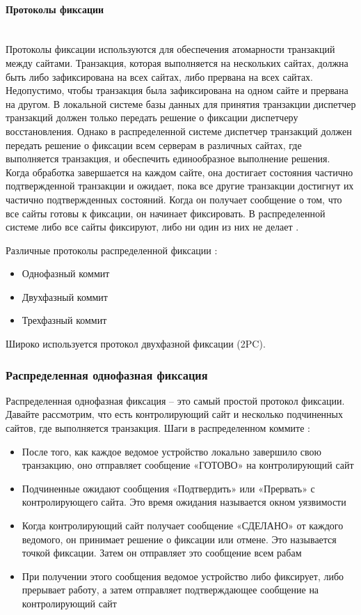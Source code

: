 \paragraph{Протоколы фиксации}~\\
Протоколы фиксации используются для обеспечения атомарности транзакций между сайтами.
Транзакция, которая выполняется на нескольких сайтах, должна быть либо зафиксирована на всех сайтах, либо прервана на всех сайтах.
Недопустимо, чтобы транзакция была зафиксирована на одном сайте и прервана на другом.
В локальной системе базы данных для принятия транзакции диспетчер транзакций должен только передать решение
о фиксации диспетчеру восстановления. Однако в распределенной системе диспетчер транзакций должен передать
решение о фиксации всем серверам в различных сайтах, где выполняется транзакция, и обеспечить
единообразное выполнение решения. Когда обработка завершается на каждом сайте, она достигает состояния
частично подтвержденной транзакции и ожидает, пока все другие транзакции достигнут их частично подтвержденных состояний.
Когда он получает сообщение о том, что все сайты готовы к фиксации, он начинает фиксировать.
В распределенной системе либо все сайты фиксируют, либо ни один из них не делает \autocite{FixProtocols}.

Различные протоколы распределенной фиксации \autocite{FixProtocols}:
\begin{itemize}
    \item Однофазный коммит
    \item Двухфазный коммит
    \item Трехфазный коммит
\end{itemize}
Широко используется протокол двухфазной фиксации (2PC).
\bigbreak
\subsubsection{Распределенная однофазная фиксация}

Распределенная однофазная фиксация – это самый простой протокол фиксации. Давайте рассмотрим, что есть
контролирующий сайт и несколько подчиненных сайтов, где выполняется транзакция. Шаги в распределенном коммите \autocite{FixProtocols}:
\begin{itemize}
    \item После того, как каждое ведомое устройство локально завершило свою транзакцию, оно
    отправляет сообщение «ГОТОВО» на контролирующий сайт
    \item Подчиненные ожидают сообщения «Подтвердить» или «Прервать» с контролирующего сайта.
    Это время ожидания называется окном уязвимости
    \item Когда контролирующий сайт получает сообщение «СДЕЛАНО» от каждого ведомого, он принимает решение
    о фиксации или отмене. Это называется точкой фиксации. Затем он отправляет это сообщение всем рабам
    \item При получении этого сообщения ведомое устройство либо фиксирует, либо прерывает работу,
    а затем отправляет подтверждающее сообщение на контролирующий сайт
\end{itemize}


